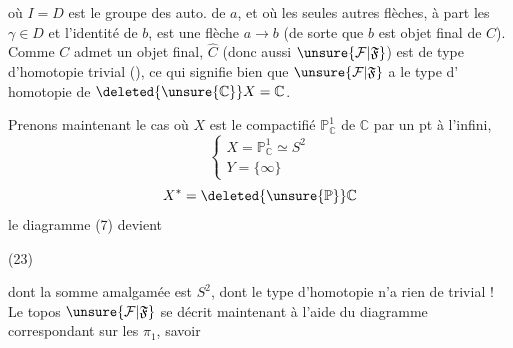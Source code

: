 où $I=D$ est le groupe des auto. de $a$, et où
les seules autres flèches, à part les $\gamma\in D$ et
l'identité de $b$, est une flèche $a\longrightarrow b$ (de
sorte que $b$ est objet final de $C$). Comme
$C$ admet un objet final, $\widehat C$  (donc aussi
$\unsure{\mathcal F|\mathfrak F}$) est de type d'homotopie trivial (),
ce qui signifie bien que $\unsure{\mathcal F|\mathfrak F}$ a le type d'
homotopie de $\deleted{\unsure{\mathbb C}}X=\mathbb C$.

Prenons maintenant le cas où $X$ est le
compactifié $\mathbb P^1_{\mathbb C}$ de $\mathbb C$ par un pt à l'infini,
\[
\left\{\begin{array}{l}
X=\mathbb P^1_{\mathbb C}\simeq S^2\\
Y=\{\infty\}
\end{array}\right.
\]
\[
X^*=\deleted{\unsure{\mathbb P}}\mathbb C
\]
le diagramme (7) devient

\noindent (23)

dont la somme amalgamée est $S^2$, dont
le type d'homotopie n'a rien de trivial !
Le topos $\unsure{\mathcal F|\mathfrak F}$ se décrit maintenant à
l'aide du diagramme correspondant sur les $\pi_1$,
savoir
